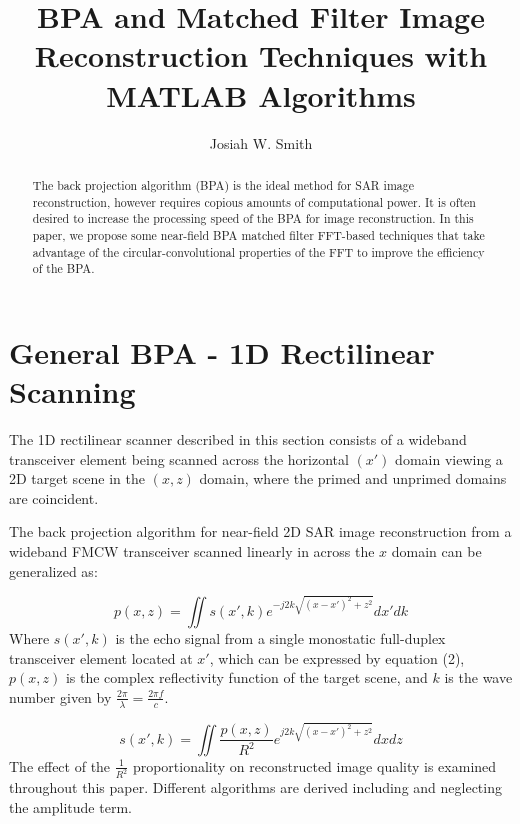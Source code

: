 \documentclass[conference]{IEEEtran}
\title{BPA and Matched Filter Image Reconstruction Techniques with MATLAB Algorithms}
\author{Josiah W. Smith}
\begin{document}
	
\maketitle
	
\begin{abstract}
		
	The back projection algorithm (BPA) is the ideal method for SAR image reconstruction, however requires copious amounts of computational power. It is often desired to increase the processing speed of the BPA for image reconstruction. In this paper, we propose some near-field BPA matched filter FFT-based techniques that take advantage of the circular-convolutional properties of the FFT to improve the efficiency of the BPA.
		
\end {abstract}
		

\section{General BPA - 1D Rectilinear Scanning}
The 1D rectilinear scanner described in this section consists of a wideband transceiver element being scanned across the horizontal $(x')$ domain viewing a 2D target scene in the $(x,z)$ domain, where the primed and unprimed domains are coincident.

The back projection algorithm for near-field 2D SAR image reconstruction from a wideband FMCW transceiver scanned linearly in across the $x$ domain can be generalized as:

\begin{equation}
	p(x,z) = \iint s(x',k) e^{-j2k \sqrt{(x-x')^2+z^2}}dx'dk
\end{equation}
Where $s(x',k)$ is the echo signal from a single monostatic full-duplex transceiver element located at $x'$, which can be expressed by equation (2), $p(x,z)$ is the complex reflectivity function of the target scene, and $k$ is the wave number given by $\frac{2\pi}{\lambda} = \frac{2\pi f}{c}$.

\begin{equation}
	s(x',k) = \iint \frac{p(x,z)}{R^2} e^{j2k\sqrt{(x-x')^2+z^2}}dxdz
\end{equation}
The effect of the $\frac{1}{R^2}$ proportionality on reconstructed image quality is examined throughout this paper. Different algorithms are derived including and neglecting the amplitude term.
\end{document}
